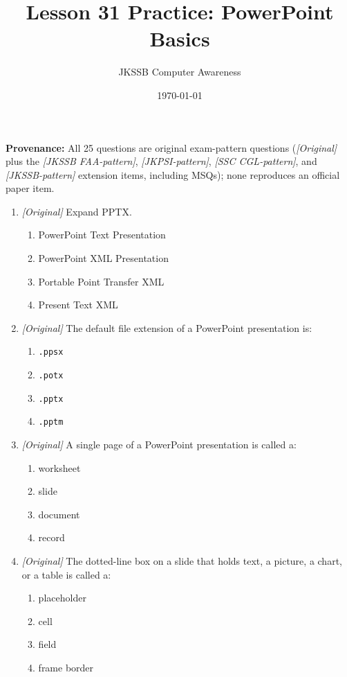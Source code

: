 \documentclass[11pt]{article}
\title{Lesson 31 Practice: PowerPoint Basics}
\author{JKSSB Computer Awareness}
\date{\today}
\begin{document}
\maketitle
\noindent\textbf{Provenance:} All 25 questions are original exam-pattern questions (\textit{[Original]} plus the \textit{[JKSSB FAA-pattern]}, \textit{[JKPSI-pattern]}, \textit{[SSC CGL-pattern]}, and \textit{[JKSSB-pattern]} extension items, including MSQs); none reproduces an official paper item.

\begin{enumerate}[label=\textbf{Q\arabic*.}, leftmargin=*]
\item \textit{[Original]} Expand PPTX.
  \begin{enumerate}[label=\Alph*.]
    \item PowerPoint Text Presentation
    \item PowerPoint XML Presentation
    \item Portable Point Transfer XML
    \item Present Text XML
  \end{enumerate}
\item \textit{[Original]} The default file extension of a PowerPoint
  presentation is:
  \begin{enumerate}[label=\Alph*.]
    \item \texttt{.ppsx}
    \item \texttt{.potx}
    \item \texttt{.pptx}
    \item \texttt{.pptm}
  \end{enumerate}
\item \textit{[Original]} A single page of a PowerPoint presentation is
  called a:
  \begin{enumerate}[label=\Alph*.]
    \item worksheet
    \item slide
    \item document
    \item record
  \end{enumerate}
\item \textit{[Original]} The dotted-line box on a slide that holds text, a
  picture, a chart, or a table is called a:
  \begin{enumerate}[label=\Alph*.]
    \item placeholder
    \item cell
    \item field
    \item frame border

\end{enumerate}
\end{enumerate}
\end{document}
